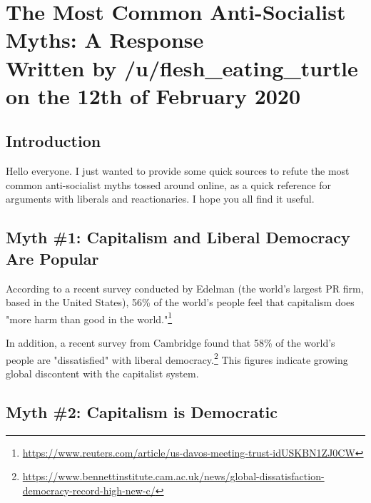 \section{The Most Common Anti-Socialist Myths: A Response\\\small{Written by /u/flesh\_eating\_turtle on the 12th of February 2020}}
\subsection*{Introduction}

Hello everyone.
I just wanted to provide some quick sources to refute the most common anti-socialist myths tossed around online, as a quick reference for arguments with liberals and reactionaries.
I hope you all find it useful.

\subsection*{Myth \#1: Capitalism and Liberal Democracy Are Popular}

According to a recent survey conducted by Edelman (the world's largest PR firm, based in the United States), 56\% of the world's people feel that capitalism does "more harm than good in the world."\footnote{\href{https://www.reuters.com/article/us-davos-meeting-trust-idUSKBN1ZJ0CW}{https://www.reuters.com/article/us-davos-meeting-trust-idUSKBN1ZJ0CW}}

In addition, a recent survey from Cambridge found that 58\% of the world's people are "dissatisfied" with liberal democracy.\footnote{\href{https://www.bennettinstitute.cam.ac.uk/news/global-dissatisfaction-democracy-record-high-new-c/}{https://www.bennettinstitute.cam.ac.uk/news/global-dissatisfaction-democracy-record-high-new-c/}}
This figures indicate growing global discontent with the capitalist system.

\subsection*{Myth \#2: Capitalism is Democratic}

